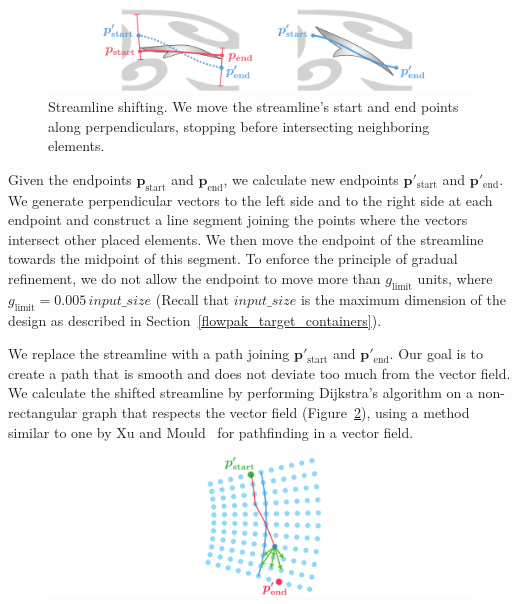 \begin{figure}
 \includegraphics[width=1.0\textwidth]{figures/flowpak/shift_streamline.pdf}
 \caption[Shifting a streamline]
 {\label{shift_streamline}
 Streamline shifting.
  We move the streamline's start and end points along 
  perpendiculars, stopping before intersecting neighboring elements.}
\end{figure}


Given the endpoints $\bm{p_\mathrm{start}}$ and $\bm{p_\mathrm{end}}$, we 
calculate new endpoints $\bm{p'_\mathrm{start}}$ and $\bm{p'_\mathrm{end}}$.
We generate perpendicular
vectors to the left side and to the right side at each endpoint and construct
a line segment joining the points where the vectors intersect other placed elements.
We then move the endpoint of the streamline towards the midpoint of this
segment. To enforce the principle of gradual refinement, we do not allow the
endpoint to move more than $g_\mathrm{limit}$ units, where 
$g_\mathrm{limit}=0.005\,input\_size$ (Recall that $input\_size$ is the maximum dimension
of the design as described in Section~\ref{flowpak_target_containers}).

We replace the streamline with a path joining
$\bm{p'_\mathrm{start}}$ and $\bm{p'_\mathrm{end}}$. Our goal
is to create a path that is smooth and does not deviate too much from the vector
field.  We calculate the shifted streamline by performing Dijkstra's
algorithm on a non-rectangular graph that respects the vector field
(Figure~\ref{dijkstra}), using a method similar to one by Xu and Mould~\cite{Xu2015} for
pathfinding in a vector field.

\begin{figure}
\includegraphics[width=1.0\textwidth]{figures/flowpak/dijkstra.pdf}
 \caption[Tracing a shortest path]
 {\label{dijkstra}
 }
\end{figure}

